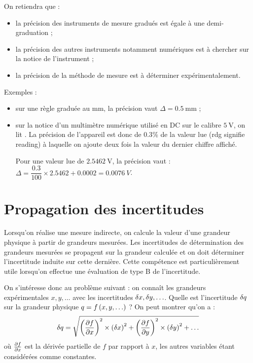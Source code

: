 On retiendra que : \begin{itemize}
\item la précision des instruments de mesure gradués est égale à une demi-graduation ;
\item la précision des autres instruments notamment numériques est à chercher sur la notice de l'instrument ;
\item la précision de la méthode de mesure est à déterminer expérimentalement. \\
\end{itemize}

Exemples : \begin{itemize}
\item sur une règle graduée au \(\unit{\milli\metre}\), la précision vaut \(\Delta=\SI{0.5}{\milli\metre}\) ;
\item sur la notice d'un multimètre numérique utilisé en DC sur le calibre \(\SI{5}{\volt}\), on lit . La précision de l'appareil est donc de \(\num{0.3}\)\% de la valeur lue (rdg signifie \foreignlanguage{british}{reading}) à laquelle on ajoute deux fois la valeur du dernier chiffre affiché.

Pour une valeur lue de \(\SI{2.5462}{\volt}\), la précision vaut : \(\Delta=\dfrac{\num{0.3}}{100}\times\num{2.5462}+\num{0.0002}=\SI{0.0076}{V}\).
\end{itemize}

\section{Propagation des incertitudes}

Lorsqu'on réalise une mesure indirecte, on calcule la valeur d'une grandeur physique à partir de grandeurs mesurées. Les incertitudes de détermination des grandeurs mesurées se propagent sur la grandeur calculée et on doit déterminer l'incertitude induite sur cette dernière. Cette compétence est particulièrement utile lorsqu'on effectue une évaluation de type B de l'incertitude.

On s'intéresse donc au problème suivant : on connaît les grandeurs expérimentales \(x,y,\ldots\) avec les incertitudes \(\fdif{x},\fdif{y},\ldots\). Quelle est l'incertitude \(\fdif{q}\) sur la grandeur physique \(q=f\left(x,y,\ldots\right)\) ? On peut montrer qu'on a : \[\fdif{q}=\sqrt{\paren{\pdv{f}{x}}^2\times\paren{\fdif{x}}^2+\paren{\pdv{f}{y}}^2\times\paren{\fdif{y}}^2+\ldots}\] où \(\pdv{f}{x}\) est la dérivée partielle de \(f\) par rapport à \(x\), les autres variables étant considérées comme constantes.